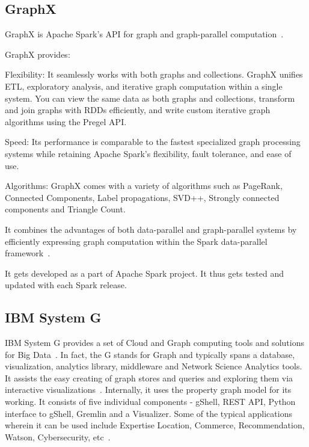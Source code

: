     \pv
    
\subsection{GraphX}

GraphX is Apache Spark's API for graph and graph-parallel
computation~\cite{www-graphX}.
	  
    GraphX provides:
    
    Flexibility: It seamlessly works with both graphs and
    collections. GraphX unifies ETL, exploratory analysis, and
    iterative graph computation within a single system. You can view
    the same data as both graphs and collections, transform and join
    graphs with RDDs efficiently, and write custom iterative graph
    algorithms using the Pregel API.
    
    Speed: Its performance is comparable to the fastest specialized
    graph processing systems while retaining Apache Spark's
    flexibility, fault tolerance, and ease of use.
    
    Algorithms: GraphX comes with a variety of algorithms such as
    PageRank, Connected Components, Label propagations, SVD++,
    Strongly connected components and Triangle Count.

    It combines the advantages of both data-parallel and
    graph-parallel systems by efficiently expressing graph computation
    within the Spark data-parallel framework~\cite{www-graphX1}.

    It gets developed as a part of Apache Spark project. It thus gets
    tested and updated with each Spark release.
    
\subsection{IBM System G}

IBM System G provides a set of Cloud and Graph computing tools and
solutions for Big Data~\cite{IBMSystemGDocumentation-1}.  In fact, the
G stands for Graph and typically spans a database, visualization,
analytics library, middleware and Network Science Analytics tools.  It
assists the easy creating of graph stores and queries and exploring
them via interactive visualizations~\cite{IBMSystemGDocumentation-2}.
Internally, it uses the property graph model for its working.  It
consists of five individual components - gShell, REST API, Python
interface to gShell, Gremlin and a Visualizer.  Some of the typical
applications wherein it can be used include Expertise Location,
Commerce, Recommendation, Watson, Cybersecurity,
etc~\cite{IBMSystemGPaper}.

